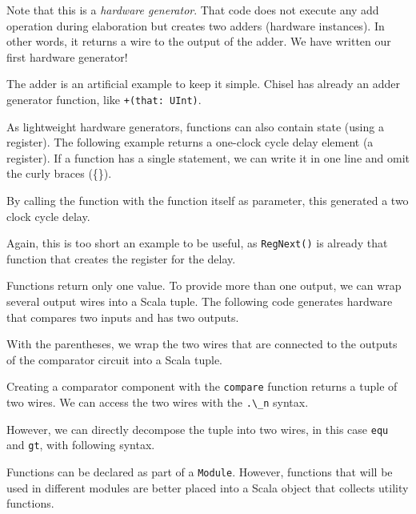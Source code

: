\documentclass[%
    10pt,
    headinclude, footinclude=false,
    openright, %
    notitlepage,
    cleardoublepage=empty,
    headsepline,
    numbers=noenddot,
    bibliography=totoc, index=totoc,
    ]{scrbook}
\newcommand{\code}[1]{{\lstinline[basicstyle=\small\ttfamily]{#1}}}
\begin{document}

\noindent Note that this is a \emph{hardware generator}. That code does not execute any add operation
during elaboration but creates two adders (hardware instances). In other words, it returns
a wire to the output of the adder.
We have written our first hardware generator!

The adder is an artificial example
to keep it simple. Chisel has already an adder generator function, like \code{+(that: UInt)}.

As lightweight hardware generators, functions can also contain state (using a register).
The following example returns a one-clock cycle delay element (a register).
If a function has a single statement, we can write it in one line and omit the curly
braces (\{\}).


\noindent By calling the function with the function itself as parameter, this generated a two
clock cycle delay.


\noindent Again, this is too short an example to be useful, as \code{RegNext()}
is already that function that creates the register for the delay.



Functions return only one value. To provide more than one output, we
can wrap several output wires into a Scala tuple. The following code generates hardware that
compares two inputs and has two outputs.


\noindent With the parentheses, we wrap the two wires that are connected to the outputs of
the comparator circuit into a Scala tuple.

Creating a comparator component
with the \code{compare} function returns a tuple of two wires. We can access the two
wires with the \code{.\_n} syntax.


\noindent However, we can directly decompose the tuple into two wires, in this case \code{equ}
and \code{gt}, with following syntax.



Functions can be declared as part of a \code{Module}. However, functions that will be
used in different modules are better placed into a Scala object that collects utility
functions.
\end{document}

